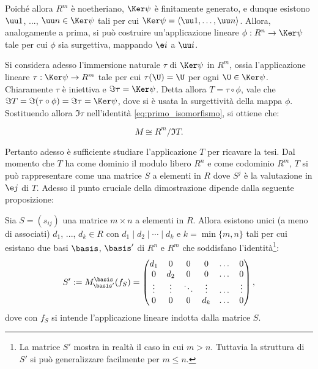 \documentclass[12pt]{scrartcl}
\begin{document}
	Poiché allora $R^m$ è noetheriano, $\Ker \psi$ è finitamente generato, e dunque
	esistono $\uu 1$, ..., $\uu n \in \Ker \psi$ tali per cui
	$\Ker \psi = \langle \uu 1, \ldots, \uu n \rangle$. Allora, analogamente
	a prima, si può costruire un'applicazione lineare $\phi : R^n \to \Ker \psi$ tale
	per cui $\phi$ sia surgettiva, mappando $\e i$ a $\uu i$. \bigskip
	
	
	Si considera adesso l'immersione naturale $\tau$ di $\Ker \psi$ in $R^m$,
	ossia l'applicazione lineare $\tau : \Ker \psi \to R^m$ tale per cui
	$\tau(\U) = \U$ per ogni $\U \in \Ker \psi$. Chiaramente $\tau$ è
	iniettiva e $\Im \tau = \Ker \psi$. Detta allora $T = \tau \circ \phi$,
	vale che $\Im T = \Im (\tau \circ \phi) = \Im \tau = \Ker \psi$, dove
	si è usata la surgettività della mappa $\phi$. Sostituendo allora
	$\Im \tau$ nell'identità \eqref{eq:primo_isomorfismo}, si ottiene che:

	\begin{equation}
		\label{eq:isomorfismo_M_T}
		M \cong R^m/\Im T.
	\end{equation} \vskip 0.1in
	
	Pertanto adesso è sufficiente studiare l'applicazione $T$ per ricavare
	la tesi. Dal momento che $T$ ha come dominio il modulo libero $R^n$ e come codominio
	$R^m$, $T$ si può rappresentare come una matrice $S$ a elementi in $R$
	dove $S^j$ è la valutazione in $\e j$ di $T$. Adesso il punto cruciale
	della dimostrazione dipende dalla seguente proposizione:
	
	\begin{proposition}
		Sia $S = (s_{ij})$ una matrice $m \times n$ a elementi in $R$. Allora esistono
		unici (a meno di associati)
		$d_1$, ..., $d_k \in R$ con $d_1 \mid d_2 \mid \cdots \mid d_k$ e
		$k = \min\{m, n\}$
		tali per cui esistano due basi $\basis$, $\basis'$ di $R^n$ e $R^m$
		che soddisfano
		l'identità\footnote{
			La matrice $S'$ mostra in realtà il caso in cui $m > n$. Tuttavia la
			struttura di $S'$ si può generalizzare facilmente per $m \leq n$.
		}:
		\[
			S' := M^{\basis}_{\basis'}(f_S) = \begin{pmatrix}
				d_1 & 0 & 0 & 0 & \dots & 0 \\
				0 & d_2 & 0 & 0 & \dots & 0 \\
				\vdots & \vdots & \ddots & \vdots & \dots & \vdots \\
				0 & 0 & 0 & d_k & \dots & 0
			\end{pmatrix},
		\]
		dove con $f_S$ si intende l'applicazione lineare indotta dalla matrice $S$.
	\end{proposition}
	
\end{document}
